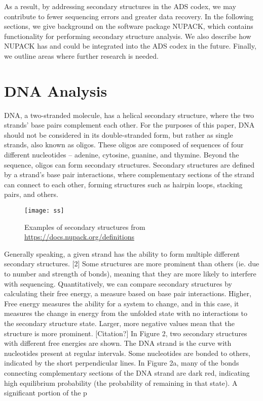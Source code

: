 \documentclass{article}
\begin{document}
As a result, by addressing secondary structures in the ADS codex, we may contribute to fewer sequencing errors and greater data recovery. In the following sections, we give background on the software package NUPACK, which contains functionality for performing secondary structure analysis. We also describe how NUPACK has and could be integrated into the ADS codex in the future. Finally, we outline areas where further research is needed.

\section{DNA Analysis}
DNA, a two-stranded molecule, has a helical secondary structure, where the two strands' base pairs complement each other. For the purposes of this paper, DNA should not be considered in its double-stranded form, but rather as single strands, also known as oligos. These oligos are composed of sequences of four different nucleotides -- adenine, cytosine, guanine, and thymine. Beyond the sequence, oligos can form secondary structures. Secondary structures are defined by a strand's base pair interactions, where complementary sections of the strand can connect to each other, forming structures such as hairpin loops, stacking pairs, and others. 

\begin{figure}[!h]
\centering
\texttt{[image: ss]}
\caption{Examples of secondary structures from \url{https://docs.nupack.org/definitions}}   
\end{figure} 


Generally speaking, a given strand has the ability to form multiple different secondary structures. [2] Some structures are more prominent than others (ie. due to number and strength of bonds), meaning that they are more likely to interfere with sequencing. Quantitatively, we can compare secondary structures by calculating their free energy, a measure based on base pair interactions. Higher, Free energy measures the ability for a system to change, and in this case, it measures the change in energy from the unfolded state with no interactions to the secondary structure state. Larger, more negative values mean that the structure is more prominent. [Citation?] In Figure 2, two secondary structures with different free energies are shown. The DNA strand is the curve with nucleotides present at regular intervals. Some nucleotides are bonded to others, indicated by the short perpendicular lines. In Figure 2a, many of the bonds connecting complementary sections of the DNA strand are dark red, indicating high equilibrium probability (the probability of remaining in that state). A significant portion of the p     
\end{document}
